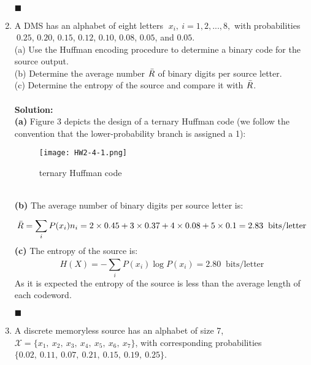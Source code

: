 \documentclass[a4paper,12pt]{article}
\begin{document}
\begin{enumerate}
\begin{align*}
            \end{align*}
            \begin{flushright}
                $\blacksquare$
            \end{flushright}
        \item 
            A DMS has an alphabet of eight letters $\; x_i, \ i = 1, 2,..., 8,$ with probabilities $\ 0.25$, $0.20$, $0.15$, $0.12$, $0.10$, $0.08$, $0.05$, and $0.05$. \\
            (a) Use the Huffman encoding procedure to determine a binary code for the source output. \\ 
            (b) Determine the average number $\Bar{R}$ of binary digits per source letter. \\ 
            (c) Determine the entropy of the source and compare it with $\Bar{R}$. \\ \\ 
            \textbf{Solution:} \\
            \textbf{(a)} 
            Figure 3 depicts the design of a ternary Huffman code (we follow the convention that the lower-probability branch is assigned a 1):
            \begin{figure}[h]
                \centering
                \texttt{[image: HW2-4-1.png]}
                \caption{ternary Huffman code}
            \end{figure} \\ 
            \textbf{(b)} 
            The average number of binary digits per source letter is: $$\Bar{R} = \sum_{i}^{}P(x_{i})n_{i} = 2 \times 0.45 + 3 \times 0.37 + 4 \times 0.08 + 5 \times 0.1 = 2.83 \;\; \text{bits/letter}$$
            \textbf{(c)} 
            The entropy of the source is: $$H(X) = - \sum_{i}^{}P(x_{i}) \log P(x_{i}) = 2.80 \;\; \text{bits/letter}$$
            As it is expected the entropy of the source is less than the average length of each codeword.
            \begin{flushright}
                $\blacksquare$
            \end{flushright}
        \item 
            A discrete memoryless source has an alphabet of size 7, $\mathcal{X} = \{ x_1, \ x_2, \ x_3, \ x_4, \ x_5, \ x_6, \ x_7 \}$, with corresponding probabilities $\{ 0.02, \ 0.11, \ 0.07, \ 0.21, \ 0.15, \ 0.19, \ 0.25 \}$. \\

\end{enumerate}
\end{document}

